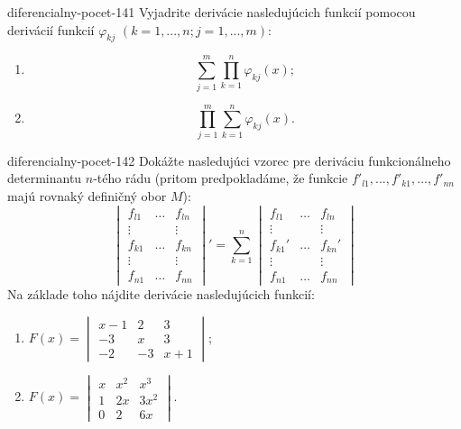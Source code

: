 \begin{defproblem}{diferencialny-pocet-141}
Vyjadrite derivácie nasledujúcich funkcií pomocou derivácií funkcií $\varphi_{kj}$ $(k=1,...,n; j=1,...,m)$:
\begin{multicols}{2}
\begin{enumerate}
    \item $$\sum_{j=1}^{m}\prod_{k=1}^n \varphi_{kj}(x);$$
	\item $$\prod_{j=1}^{m}\sum_{k=1}^n \varphi_{kj}(x).$$
\end{enumerate}
\end{multicols}
\end{defproblem}

\begin{defproblem}{diferencialny-pocet-142}
Dokážte nasledujúci vzorec pre deriváciu funkcionálneho determinantu $n$-tého rádu (pritom predpokladáme, že funkcie $f'_{l1},...,f'_{k1},...,f'_{nn}$ majú rovnaký definičný obor $M$):
$$\begin{vmatrix}
f_{l1} & \dots & f_{ln} \\ 
\vdots & & \vdots\\ 
f_{k1} & \dots & f_{kn} \\ 
\vdots & & \vdots\\ 
f_{n1} & \dots & f_{nn} 
\end{vmatrix}'
= \sum_{k=1}^n
\begin{vmatrix}
f_{l1} & \dots & f_{ln} \\ 
\vdots & & \vdots\\ 
f_{k1}' & \dots & f_{kn}' \\ 
\vdots & & \vdots\\ 
f_{n1} & \dots & f_{nn} 
\end{vmatrix}$$
Na základe toho nájdite derivácie nasledujúcich funkcií:
\begin{multicols}{2}
\begin{enumerate}
\item $F(x)=
\begin{vmatrix}
x-1 & 2 & 3 \\ 
-3 & x & 3 \\ 
-2 & -3 & x+1
\end{vmatrix};$
\item $F(x)=
\begin{vmatrix}
x & x^2 & x^3 \\ 
1 & 2x & 3x^2 \\ 
0 & 2 & 6x
\end{vmatrix}.$
\end{enumerate}
\end{multicols}
\end{defproblem}


